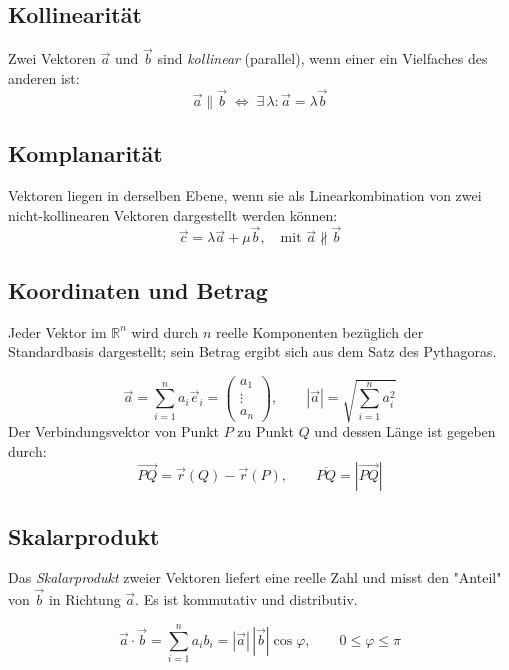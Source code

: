 \subsection{Kollinearität}
Zwei Vektoren $\vec a$ und $\vec b$ sind \emph{kollinear} (parallel), wenn einer ein Vielfaches des anderen ist:
\[
     \vec a \parallel \vec b \;\Leftrightarrow\; \exists\,\lambda\colon \vec a = \lambda\vec b
\]

\subsection{Komplanarität}
Vektoren liegen in derselben Ebene, wenn sie als Linearkombination von zwei nicht-kollinearen Vektoren dargestellt werden können:
\[
     \vec c = \lambda\vec a + \mu\vec b, \quad \text{mit } \vec a \nparallel \vec b
\]

\subsection{Koordinaten und Betrag}

Jeder Vektor im $\mathbb{R}^n$ wird durch $n$ reelle Komponenten bezüglich der Standardbasis dargestellt; sein Betrag ergibt sich aus dem Satz des Pythagoras.

\[
     \vec a = \sum_{i=1}^{n} a_i \vec e_i =
     \begin{pmatrix} a_1 \\ \vdots \\ a_n \end{pmatrix}, \qquad
     |\vec a| = \sqrt{\sum_{i=1}^{n} a_i^2}
\]
Der Verbindungsvektor von Punkt $P$ zu Punkt $Q$ und dessen Länge ist gegeben durch:
\[
     \overrightarrow{PQ} = \vec r(Q) - \vec r(P), \qquad
     \overline{PQ} = |\overrightarrow{PQ}|
\]



\subsection{Skalarprodukt}

Das \emph{Skalarprodukt} zweier Vektoren liefert eine reelle Zahl und misst den "Anteil" von $\vec{b}$ in Richtung $\vec{a}$. Es ist kommutativ und distributiv.

\[
     \vec a \cdot \vec b = \sum_{i=1}^{n} a_i b_i = |\vec a|\,|\vec b|\cos\varphi, \qquad 0 \le \varphi \le \pi
\]

